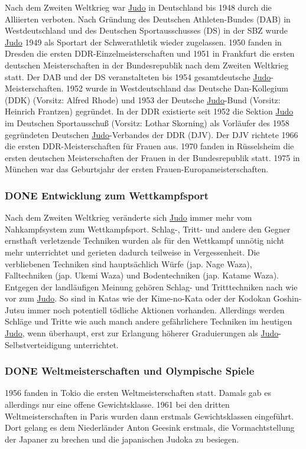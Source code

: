 \documentclass[11pt]{article}
\begin{document}
Nach dem Zweiten Weltkrieg war \hyperref[org5f8b831]{Judo} in Deutschland bis 1948 durch die Alliierten verboten. Nach Gründung des Deutschen Athleten-Bundes (DAB) in Westdeutschland und des Deutschen Sportausschusses (DS) in der SBZ wurde \hyperref[org5f8b831]{Judo} 1949 als Sportart der Schwerathletik wieder zugelassen. 1950 fanden in Dresden die ersten DDR-Einzelmeisterschaften und 1951 in Frankfurt die ersten deutschen Meisterschaften in der Bundesrepublik nach dem Zweiten Weltkrieg statt. Der DAB und der DS veranstalteten bis 1954 gesamtdeutsche \hyperref[org5f8b831]{Judo}-Meisterschaften. 1952 wurde in Westdeutschland das Deutsche Dan-Kollegium (DDK) (Vorsitz: Alfred Rhode) und 1953 der Deutsche \hyperref[org5f8b831]{Judo}-Bund (Vorsitz: Heinrich Frantzen) gegründet. In der DDR existierte seit 1952 die Sektion \hyperref[org5f8b831]{Judo} im Deutschen Sportausschuß (Vorsitz: Lothar Skorning) als Vorläufer des 1958 gegründeten Deutschen \hyperref[org5f8b831]{Judo}-Verbandes der DDR (DJV). Der DJV richtete 1966 die ersten DDR-Meisterschaften für Frauen aus. 1970 fanden in Rüsselsheim die ersten deutschen Meisterschaften der Frauen in der Bundesrepublik statt. 1975 in München war das Geburtsjahr der ersten Frauen-Europameisterschaften.

\subsubsection{{\bfseries\sffamily DONE} Entwicklung zum Wettkampfsport}
\label{sec:orga89ba98}
Nach dem Zweiten Weltkrieg veränderte sich \hyperref[org5f8b831]{Judo} immer mehr vom Nahkampfsystem zum Wettkampfsport. Schlag-, Tritt- und andere den Gegner ernsthaft verletzende Techniken wurden als für den Wettkampf unnötig nicht mehr unterrichtet und gerieten dadurch teilweise in Vergessenheit. Die verbliebenen Techniken sind hauptsächlich Würfe (jap. Nage Waza), Falltechniken (jap. Ukemi Waza) und Bodentechniken (jap. Katame Waza). Entgegen der landläufigen Meinung gehören Schlag- und Tritttechniken nach wie vor zum \hyperref[org5f8b831]{Judo}. So sind in Katas wie der Kime-no-Kata oder der Kodokan Goshin-Jutsu immer noch potentiell tödliche Aktionen vorhanden. Allerdings werden Schläge und Tritte wie auch manch andere gefährlichere Techniken im heutigen \hyperref[org5f8b831]{Judo}, wenn überhaupt, erst zur Erlangung höherer Graduierungen als \hyperref[org5f8b831]{Judo}-Selbstverteidigung unterrichtet.

\subsubsection{{\bfseries\sffamily DONE} Weltmeisterschaften und Olympische Spiele}
\label{sec:org27d4646}
1956 fanden in Tokio die ersten Weltmeisterschaften statt. Damals gab es allerdings nur eine offene Gewichtsklasse. 1961 bei den dritten Weltmeisterschaften in Paris wurden dann erstmals Gewichtsklassen eingeführt. Dort gelang es dem Niederländer Anton Geesink erstmals, die Vormachtstellung der Japaner zu brechen und die japanischen Judoka zu besiegen.
\end{document}
